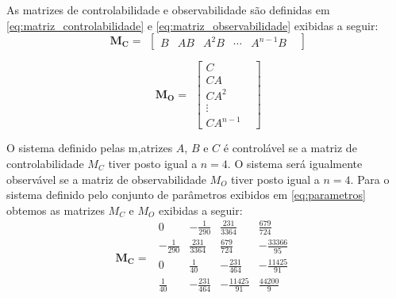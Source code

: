     As matrizes de controlabilidade e observabilidade são definidas em \ref{eq:matriz_controlabilidade} e \ref{eq:matriz_observabilidade} exibidas a seguir:
    \begin{equation} \label{eq:matriz_controlabilidade}
        \begin{split}
             \mathbf{M_C}=
        \end{split}
        \begin{bmatrix}
            B& AB& A^2B& \cdots& A^{n-1}B&
        \end{bmatrix}
    \end{equation}

    \begin{equation} \label{eq:matriz_observabilidade}
        \begin{split}
             \mathbf{M_O}=
        \end{split}
        \begin{bmatrix}
            C&\\
            CA&\\
            CA^2&\\
            \vdots&\\
            CA^{n-1}&
        \end{bmatrix}
    \end{equation}

    O sistema definido pelas m,atrizes $A$, $B$ e $C$ é controlável se a matriz de controlabilidade $M_C$ tiver posto igual a $n=4$. O sistema será igualmente observável se a matriz de observabilidade $M_O$ tiver posto igual a $n=4$. Para o sistema definido pelo conjunto de parâmetros exibidos em \ref{eq:parametros} obtemos as matrizes $M_C$ e $M_O$ exibidas a seguir:
    \FloatBarrier
    \begin{equation} \label{eq:MC}
          \begin{split}
             \mathbf{M_C}=
        \end{split}
    \begin{smallmatrix}
                   0& -\frac{1}{290}&     \frac{231}{3364}&  \frac{679}{724}&\\  
      -\frac{1}{290}&  \frac{231}{3364}&  \frac{679}{724}&   -\frac{33366}{95}&\\
                   0&  \frac{1}{40}&     -\frac{231}{464}&  -\frac{11425}{91}&\\  
        \frac{1}{40}& -\frac{231}{464}&  -\frac{11425}{91}&  \frac{44200}{9}&\\
    \end{smallmatrix}
    \end{equation}
 
